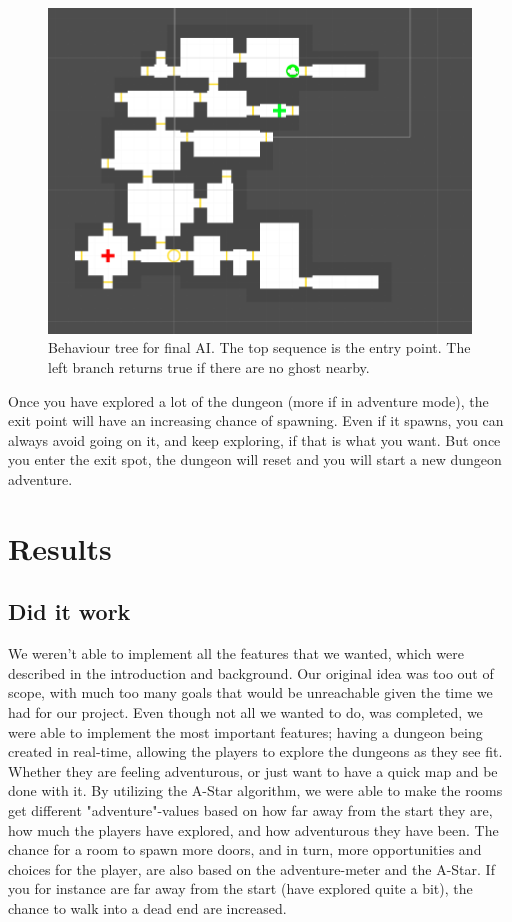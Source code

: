 \documentclass[conference,compsoc]{IEEEtran}
\begin{document}
\begin{figure}[h]
	\graphicspath{{figures/}}
	\includegraphics[width = \columnwidth ]{DungeonLayout.png}
	\caption{Behaviour tree for final AI. The top sequence is the entry point. The left branch returns true if there are no ghost nearby.}
	\label{fig:behavTree}
\end{figure}
Once you have explored a lot of the dungeon (more if in adventure mode), the exit point will have an increasing chance of spawning. Even if it spawns, you can always avoid going on it, and keep exploring, if that is what you want. But once you enter the exit spot, the dungeon will reset and you will start a new dungeon adventure.
\section{Results}
\subsection{Did it work}
We weren't able to implement all the features that we wanted, which were described in the introduction and background. Our original idea was too out of scope, with much too many goals that would be unreachable given the time we had for our project. Even though not all we wanted to do, was completed, we were able to implement the most important features; having a dungeon being created in real-time, allowing the players to explore the dungeons as they see fit. Whether they are feeling adventurous, or just want to have a quick map and be done with it. 
By utilizing the A-Star algorithm, we were able to make the rooms get different "adventure"-values based on how far away from the start they are, how much the players have explored, and how adventurous they have been. The chance for a room to spawn more doors, and in turn, more opportunities and choices for the player, are also based on the adventure-meter and the A-Star. If you for instance are far away from the start (have explored quite a bit), the chance to walk into a dead end are increased.
\end{document}
